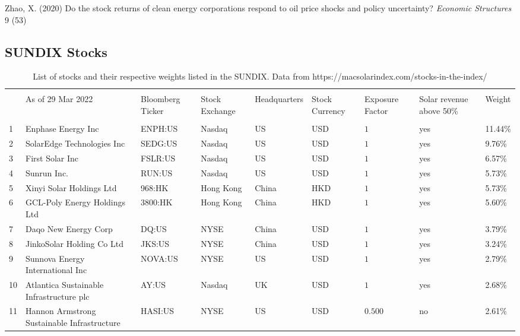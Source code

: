 \documentclass[11pt]{article}
\begin{document}
Zhao, X. (2020) Do the stock returns of clean energy corporations respond to oil price shocks and policy uncertainty? \textit{Economic Structures} 9 (53)
\newline


\begin{appendices}

\begin{landscape}
\section{SUNDIX Stocks}
\scriptsize
\begin{longtable}{ *{9}{l} }
  \caption{List of stocks and their respective weights listed in the SUNDIX. Data from https://macsolarindex.com/stocks-in-the-index/} 
  \label{SUNDIX_stocks} 
\\[-1.8ex]
\hline \\[-1.8ex] 
 & As of 29 Mar 2022 & Bloomberg Ticker & Stock Exchange & Headquarters & Stock Currency & Exposure Factor & Solar revenue above 50\% & Weight \\ 
\hline \\[-1.8ex] 
1 & Enphase Energy Inc & ENPH:US & Nasdaq & US & USD & $1$ & yes & 11.44\% \\ 
2 & SolarEdge Technologies Inc & SEDG:US & Nasdaq & US & USD & $1$ & yes & 9.76\% \\ 
3 & First Solar Inc & FSLR:US & Nasdaq & US & USD & $1$ & yes & 6.57\% \\ 
4 & Sunrun Inc. & RUN:US & Nasdaq & US & USD & $1$ & yes & 5.73\% \\ 
5 & Xinyi Solar Holdings Ltd & 968:HK & Hong Kong & China & HKD & $1$ & yes & 5.73\% \\ 
6 & GCL-Poly Energy Holdings Ltd & 3800:HK & Hong Kong & China & HKD & $1$ & yes & 5.60\% \\ 
7 & Daqo New Energy Corp & DQ:US & NYSE & China & USD & $1$ & yes & 3.79\% \\ 
8 & JinkoSolar Holding Co Ltd & JKS:US & NYSE & China & USD & $1$ & yes & 3.24\% \\ 
9 & Sunnova Energy International Inc & NOVA:US & NYSE & US & USD & $1$ & yes & 2.79\% \\ 
10 & Atlantica Sustainable Infrastructure plc & AY:US & Nasdaq & UK & USD & $1$ & yes & 2.68\% \\ 
11 & Hannon Armstrong Sustainable Infrastructure & HASI:US & NYSE & US & USD & $0.500$ & no & 2.61\% \\ 

\end{longtable}
\end{landscape}
\end{appendices}
\end{document}
